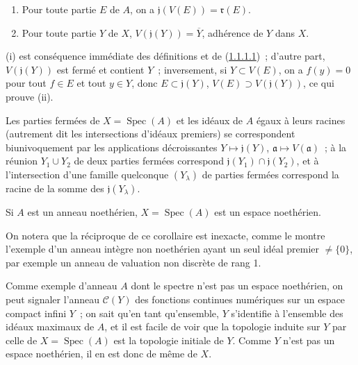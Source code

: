 \begin{proposition}[1.1.4]
\label{I.1.1.4-fr}
\begin{enumerate}
  \item[\rm(i)] Pour toute partie $E$ de $A$, on a
  $\mathfrak{j}(V(E))=\mathfrak{r}(E)$.
  \item[\rm(ii)] Pour toute partie $Y$ de $X$,
  $V(\mathfrak{j}(Y))=\overline{Y}$, adhérence de $Y$ dans $X$.
\end{enumerate}
\end{proposition}

(i) est conséquence immédiate des définitions et de
(\hyperref[I.1.1.1.1-fr]{1.1.1.1})~; d'autre part,
$V(\mathfrak{j}(Y))$ est fermé et contient $Y$~; inversement, si
$Y\subset V(E)$, on a $f(y)=0$ pour tout $f\in E$ et tout $y\in Y$, donc
$E\subset\mathfrak{j}(Y)$, $V(E)\supset V(\mathfrak{j}(Y))$, ce qui prouve
(ii).

\begin{corollary}[1.1.5]
\label{I.1.1.5-fr}
Les parties fermées de $X=\operatorname{Spec}(A)$ et les idéaux de $A$ égaux
à leurs racines (autrement dit les intersections d'idéaux premiers) se
correspondent biunivoquement par les applications décroissantes
$Y\mapsto\mathfrak{j}(Y)$, $\mathfrak{a}\mapsto V(\mathfrak{a})$~; à la
réunion $Y_1\cup Y_2$ de deux parties fermées correspond
$\mathfrak{j}(Y_1)\cap\mathfrak{j}(Y_2)$, et à l'intersection d'une famille
quelconque $(Y_\lambda)$ de parties fermées correspond la racine de la somme
des $\mathfrak{j}(Y_\lambda)$.
\end{corollary}

\begin{corollary}[1.1.6]
\label{I.1.1.6-fr}
Si $A$ est un anneau noethérien, $X=\operatorname{Spec}(A)$ est un espace
noethérien.
\end{corollary}

On notera que la réciproque de ce corollaire est inexacte, comme le montre
l'exemple d'un anneau intègre non noethérien ayant un seul idéal premier
$\neq\{0\}$, par exemple un anneau de valuation non discrète de rang 1.

Comme exemple d'anneau $A$ dont le spectre n'est pas un espace noethérien, on
peut signaler l'anneau $\mathcal{C}(Y)$ des fonctions continues numériques sur
un espace compact infini $Y$~; on sait qu'en tant qu'ensemble, $Y$ s'identifie
à l'ensemble des idéaux maximaux de $A$, et il est facile de voir que la
topologie induite sur $Y$ par celle de $X=\operatorname{Spec}(A)$ est la
topologie initiale de $Y$. Comme $Y$ n'est pas un espace noethérien, il en est
donc de même de $X$.

